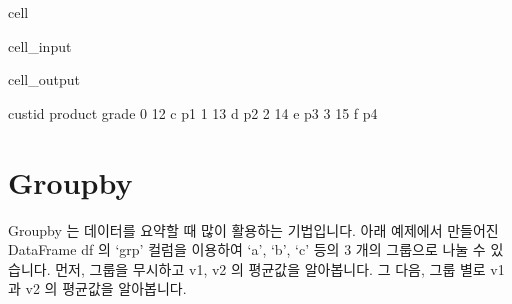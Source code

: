 \documentclass[letterpaper,10pt,english]{jupyterBook}
\begin{document}
\begin{sphinxuseclass}{cell}\begin{sphinxVerbatimInput}

\begin{sphinxuseclass}{cell_input}
\begin{sphinxVerbatim}[commandchars=\\\{\}]
   
\end{sphinxVerbatim}

\end{sphinxuseclass}\end{sphinxVerbatimInput}
\begin{sphinxVerbatimOutput}

\begin{sphinxuseclass}{cell_output}
\begin{sphinxVerbatim}[commandchars=\\\{\}]
   cust\PYGZus{}id product grade
0       12       c    p1
1       13       d    p2
2       14       e    p3
3       15       f    p4
\end{sphinxVerbatim}

\end{sphinxuseclass}\end{sphinxVerbatimOutput}

\end{sphinxuseclass}

\section{Groupby}
\label{\detokenize{chapter2/2.2.3_Useful_Techniques:groupby}}\label{\detokenize{chapter2/2.2.3_Useful_Techniques::doc}}
\sphinxAtStartPar
Groupby 는 데이터를 요약할 때 많이 활용하는 기법입니다. 아래 예제에서 만들어진 DataFrame \sphinxhyphen{} df 의 ‘grp’ 컬럼을 이용하여 ‘a’, ‘b’, ‘c’ 등의 3 개의 그룹으로 나눌 수 있습니다.
먼저, 그룹을 무시하고 v1, v2 의 평균값을 알아봅니다. 그 다음, 그룹 별로 v1 과 v2 의 평균값을 알아봅니다.
\end{document}
